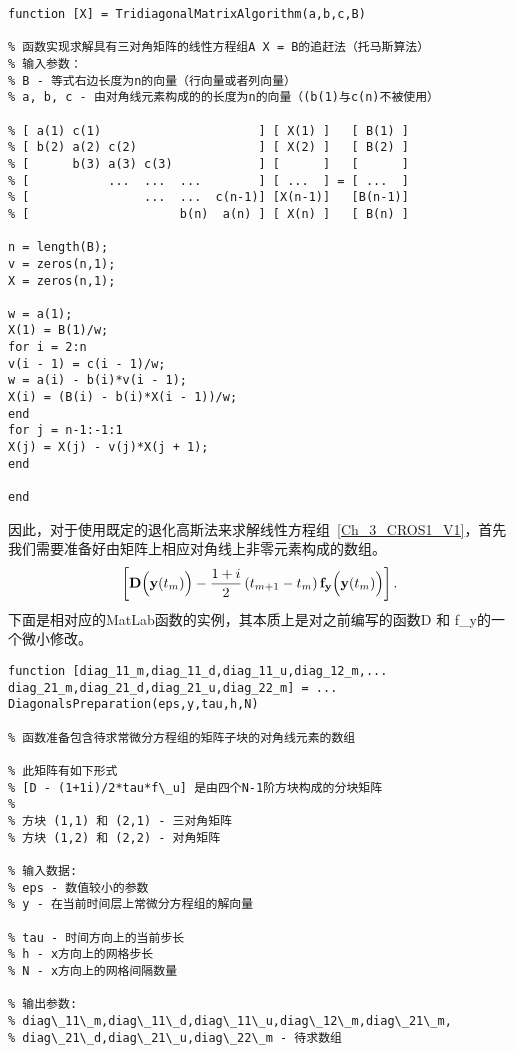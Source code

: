 \documentclass[twoside]{book}
\def\textbf{\bf}%
\begin{document}
\begin{CJK*}{GBK}{song}
\begin{lstlisting}
function [X] = TridiagonalMatrixAlgorithm(a,b,c,B)

% 函数实现求解具有三对角矩阵的线性方程组A X = B的追赶法（托马斯算法）
% 输入参数：
% B - 等式右边长度为n的向量（行向量或者列向量）
% a, b, c - 由对角线元素构成的的长度为n的向量（(b(1)与c(n)不被使用）

% [ a(1) c(1)                      ] [ X(1) ]   [ B(1) ]
% [ b(2) a(2) c(2)                 ] [ X(2) ]   [ B(2) ]
% [      b(3) a(3) c(3)            ] [      ]   [      ]
% [           ...  ...  ...        ] [ ...  ] = [ ...  ]
% [                ...  ...  c(n-1)] [X(n-1)]   [B(n-1)]
% [                     b(n)  a(n) ] [ X(n) ]   [ B(n) ]

n = length(B);
v = zeros(n,1);
X = zeros(n,1);

w = a(1);
X(1) = B(1)/w;
for i = 2:n
v(i - 1) = c(i - 1)/w;
w = a(i) - b(i)*v(i - 1);
X(i) = (B(i) - b(i)*X(i - 1))/w;
end
for j = n-1:-1:1
X(j) = X(j) - v(j)*X(j + 1);
end

end
\end{lstlisting}

因此，对于使用既定的退化高斯法来求解线性方程组~\eqref{Ch_3_CROS1_V1}，首先我们需要准备好由矩阵上相应对角线上非零元素构成的数组。
\begin{equation*}
\left[\emph{\textbf{D}}\Big(\emph{\textbf{y}}(t_m)\Big) - \dfrac{1 + i}{2} \, (t_{m + 1} - t_m) \, \emph{\textbf{f}}_\emph{\textbf{y}}\Big(\emph{\textbf{y}}(t_m)\Big)\right].
\end{equation*}
下面是相对应的MatLab函数的实例，其本质上是对之前编写的函数D 和 f\_y的一个微小修改。
%
\begin{lstlisting}
function [diag_11_m,diag_11_d,diag_11_u,diag_12_m,...
diag_21_m,diag_21_d,diag_21_u,diag_22_m] = ...
DiagonalsPreparation(eps,y,tau,h,N)

% 函数准备包含待求常微分方程组的矩阵子块的对角线元素的数组

% 此矩阵有如下形式
% [D - (1+1i)/2*tau*f\_u] 是由四个N-1阶方块构成的分块矩阵
%
% 方块 (1,1) 和 (2,1) - 三对角矩阵
% 方块 (1,2) 和 (2,2) - 对角矩阵

% 输入数据:
% eps - 数值较小的参数
% y - 在当前时间层上常微分方程组的解向量

% tau - 时间方向上的当前步长
% h - x方向上的网格步长
% N - x方向上的网格间隔数量

% 输出参数:
% diag\_11\_m,diag\_11\_d,diag\_11\_u,diag\_12\_m,diag\_21\_m,
% diag\_21\_d,diag\_21\_u,diag\_22\_m - 待求数组


\end{lstlisting}
\end{CJK*}
\end{document}
